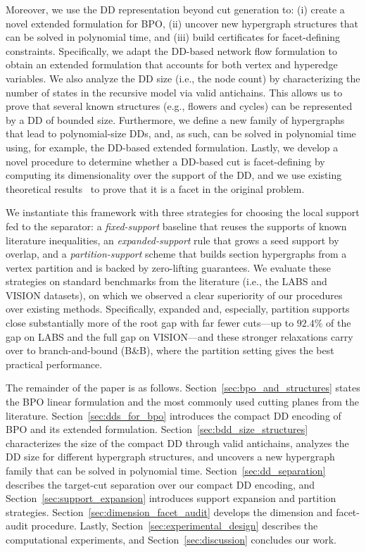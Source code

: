 Moreover, we use the DD representation beyond cut generation to: (i) create a novel extended formulation for BPO, (ii) uncover new hypergraph structures that can be solved in polynomial time, and (iii) build certificates for facet-defining constraints. Specifically, we adapt the DD-based network flow formulation to obtain an extended formulation that accounts for both vertex and hyperedge variables. We also analyze the DD size (i.e., the node count) by characterizing the number of states in the recursive model via valid antichains. This allows us to prove that several known structures (e.g., flowers and cycles) can be represented by a DD of bounded size. Furthermore, we define a new family of hypergraphs that lead to polynomial-size DDs, and, as such, can be solved in polynomial time using, for example, the DD-based extended formulation. Lastly, we develop a novel procedure to determine whether a DD-based cut is facet-defining by computing its dimensionality over the support of the DD, and we use existing theoretical results~\cite{del2017polyhedral} to prove that it is a facet in the original problem.

We instantiate this framework with three strategies for choosing the local support fed to the separator: a \emph{fixed-support} baseline that reuses the supports of known literature
inequalities, an \emph{expanded-support} rule that grows a seed support by overlap, and a \emph{partition-support} scheme that builds section hypergraphs from a vertex partition and is backed by zero-lifting guarantees. We evaluate these strategies on standard benchmarks from the literature (i.e., the LABS and VISION datasets), on which we observed a clear superiority of our procedures over existing methods. Specifically, expanded and, especially, partition
supports close substantially more of the root gap with far fewer cuts---up to $92.4\%$ of the
gap on LABS and the full gap on VISION---and these stronger relaxations carry over to
branch-and-bound (B\&B), where the partition setting gives the best practical performance.

The remainder of the paper is as follows. Section~\ref{sec:bpo_and_structures} states the BPO linear formulation and the most commonly used cutting planes from the literature. Section~\ref{sec:dds_for_bpo} introduces the compact DD encoding of BPO and its extended formulation. Section~\ref{sec:bdd_size_structures} characterizes the size of the compact DD through valid antichains, analyzes the DD size for different hypergraph structures, and uncovers a new hypergraph family that can be solved in polynomial time. Section~\ref{sec:dd_separation} describes the target-cut separation over our compact DD encoding, and Section~\ref{sec:support_expansion} introduces support expansion and partition strategies. Section~\ref{sec:dimension_facet_audit} develops the dimension and facet-audit procedure. Lastly, Section~\ref{sec:experimental_design} describes the computational experiments, and Section~\ref{sec:discussion} concludes our work.
